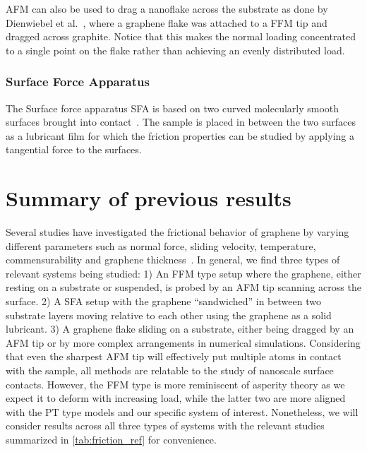 \acrshort{AFM} can also be used to drag a nanoflake across the substrate as done by
Dienwiebel et al.~\cite{DIENWIEBEL2005197}, where a graphene flake was attached
to a \acrshort{FFM} tip and dragged across graphite. Notice that this makes the normal
loading concentrated to a single point on the flake rather than achieving an evenly distributed load. 



\subsubsection{Surface Force Apparatus}
The Surface force apparatus \acrshort{SFA} is based on two curved molecularly smooth surfaces brought into contact~\cite[p. 188]{gnecco_meyer_2015}. The sample is placed in between the two surfaces as a lubricant film for which the friction properties can be studied by applying a tangential force to the surfaces. 




\section{Summary of previous results}\label{sec:prev_results}
Several studies have investigated the frictional behavior of graphene by varying
different parameters such as normal force, sliding velocity, temperature,
commensurability and graphene thickness~\cite{penkov_tribology_2014}. In
general, we find three types of relevant systems being studied: 1) An
\acrshort{FFM} type setup where the graphene, either resting on a substrate or
suspended, is probed by an \acrshort{AFM} tip scanning across the surface. 2) A
\acrshort{SFA} setup with the graphene ``sandwiched'' in between two
substrate layers moving relative to each other using the graphene as a solid
lubricant. 3) A graphene flake sliding on a substrate, either being dragged by
an \acrshort{AFM} tip or by more complex arrangements in numerical simulations.
Considering that even the sharpest \acrshort{AFM} tip will effectively put
multiple atoms in contact with the sample, all methods are relatable to the study of nanoscale surface contacts. However, the \acrshort{FFM} type is more reminiscent of asperity theory as we expect it to deform with increasing load, while the latter two are more aligned with the \acrshort{PT} type models and our specific system of interest. Nonetheless, we will consider results across all three types of systems with the relevant studies summarized in \cref{tab:friction_ref} for convenience. 


